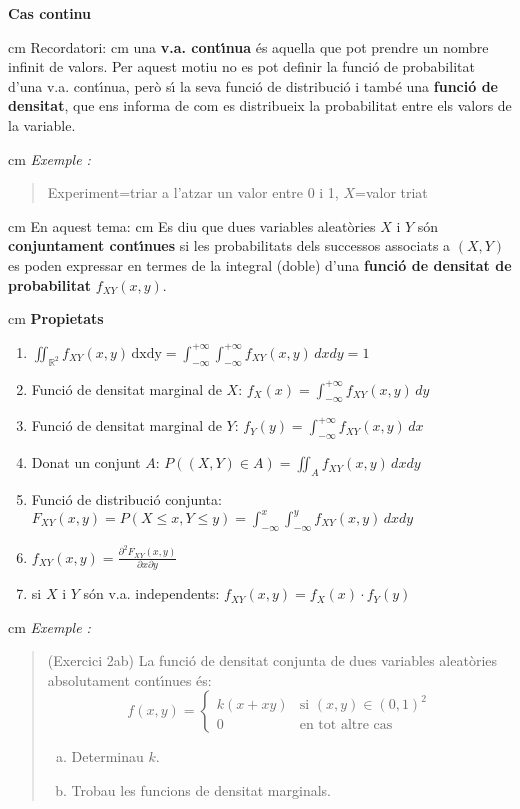 \documentclass{article}
\newcommand\R{\mathbb{R}}
\newcounter{exctr}
\newenvironment{exemple}
{ \stepcounter{exctr} 
\hspace{0.2cm} 
\textit{Exemple  \arabic{exctr}: }
\it
\begin{quotation}
}{\end{quotation}}
\begin{document}
\noindent
\textbf{\large Cas continu}

 cm
\noindent
Recordatori:
 cm
una \textbf{v.a. cont\'\i nua} \'es aquella que pot prendre un nombre infinit de valors. 
Per aquest motiu no es pot definir la funci\'o de probabilitat d'una v.a. cont\'\i nua, 
per\`o s\'\i $ $ la seva funci\'o de distribuci\'o i tamb\'e una \textbf{funci\'o 
de densitat}, que ens informa de com es distribueix la probabilitat entre
els valors de la variable.

 cm
\begin{exemple}
Experiment=triar a l'atzar un valor entre 0 i 1, $X$=valor triat
\end{exemple}
  

 cm
\noindent
En aquest tema:
 cm
Es diu que dues variables aleat\`ories $X$ i $Y$ s\'on \textbf{conjuntament cont\'\i nues}
si les probabilitats dels successos associats a $(X, Y)$ es poden expressar en termes de
la integral (doble) d'una \textbf{funci\'o de densitat de probabilitat} $f_{XY}(x, y)$.

 cm
\textbf{Propietats}
\begin{enumerate}
\item 
$
\iint_{\R^2} f_{XY}(x, y) \, \mathrm{dx}\mathrm{dy}=
\int_{-\infty}^{+\infty} \int_{-\infty}^{+\infty} f_{XY}(x, y) \, dxdy = 1
$
\item Funci\'o de densitat marginal de $X$:
$
f_X(x)=\int_{-\infty}^{+\infty} f_{XY}(x, y) \, dy
$
\item Funci\'o de densitat marginal de $Y$:
$
f_Y(y)=\int_{-\infty}^{+\infty} f_{XY}(x, y) \, dx
$
\item Donat un conjunt $A$: 
$
P((X, Y) \in A) = \iint_{A} f_{XY}(x, y) \, dxdy
$
\item Funci\'o de distribuci\'o conjunta:
$
F_{XY}(x, y)=P(X \leq x, Y \leq y)=\int_{-\infty}^{x} \int_{-\infty}^{y} f_{XY}(x, y) \, dxdy
$
\item 
$
f_{XY}(x, y)=\frac{\partial^2 F_{XY}(x, y)}{\partial x \partial y}
$
\item si $X$ i $Y$ s\'on v.a. independents: $f_{XY}(x, y)=f_X(x) \cdot f_Y(y)$
\end{enumerate}


 cm
\begin{exemple}
(Exercici 2ab) La funci\'o de densitat conjunta de dues variables aleat\`ories
absolutament cont\'{\i}nues \'es: 
\[
f (x,y) = \begin{cases}k(x+xy) & \text{si } (x,y) \in (0,1)^2\\
0 & \text{en tot altre cas} \end{cases}
\]
\begin{enumerate}[a)]
\item Determinau $k$. 
\item Trobau les funcions de densitat marginals.
\end{enumerate}

\end{exemple}
\end{document}
